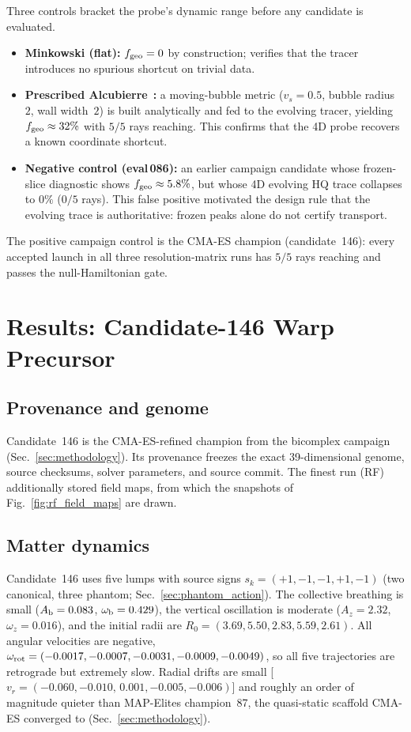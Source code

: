 \documentclass[twocolumn,floatfix,aps,prd,nofootinbib]{revtex4-2}
\begin{document}
Three controls bracket the probe's dynamic range before any candidate is
evaluated.
\begin{itemize}
  \item \textbf{Minkowski (flat):} $f_{\rm geo}=0$ by construction; verifies
    that the tracer introduces no spurious shortcut on trivial data.
  \item \textbf{Prescribed Alcubierre}~\cite{alcubierre94}\textbf{:} a
    moving-bubble metric ($v_s=0.5$, bubble radius~$2$, wall width~$2$) is
    built analytically and fed to the evolving tracer, yielding
    $f_{\rm geo}\approx32\%$ with $5/5$ rays reaching. This confirms
    that the 4D probe recovers a known coordinate shortcut.
  \item \textbf{Negative control (eval\,086):} an earlier campaign candidate
    whose frozen-slice diagnostic shows $f_{\rm geo}\approx5.8\%$, but whose
    4D evolving HQ trace collapses to $0\%$ ($0/5$ rays). This false positive
    motivated the design rule that the evolving trace is authoritative: frozen
    peaks alone do not certify transport.
\end{itemize}
The positive campaign control is the CMA-ES champion (candidate~146): every
accepted launch in all three resolution-matrix runs has $5/5$ rays reaching
and passes the null-Hamiltonian gate.

\section{Results: Candidate-146 Warp Precursor}
\label{sec:results}

\subsection{Provenance and genome}

Candidate~146 is the CMA-ES-refined champion from the bicomplex campaign
(Sec.~\ref{sec:methodology}). Its provenance freezes the exact
39-dimensional genome, source checksums, solver parameters, and source
commit. The finest run (RF) additionally stored field maps, from which the
snapshots of Fig.~\ref{fig:rf_field_maps} are drawn.

\subsection{Matter dynamics}

Candidate~146 uses five lumps with source signs
$s_k=(+1,-1,-1,+1,-1)$ (two canonical, three phantom;
Sec.~\ref{sec:phantom_action}).
The collective breathing is small ($A_{\rm b}=0.083$,
$\omega_{\rm b}=0.429$), the vertical oscillation is moderate ($A_z=2.32$,
$\omega_z=0.016$), and the initial radii are
$R_0=(3.69,5.50,2.83,5.59,2.61)$. All angular velocities are negative,
$\omega_{\rm rot}=(-0.0017,-0.0007,-0.0031,-0.0009,-0.0049)$, so all five
trajectories are retrograde but extremely slow. Radial drifts are small
[$v_r=(-0.060,-0.010,\,0.001,-0.005,-0.006)$] and roughly an order of
magnitude quieter than MAP-Elites champion~87, the quasi-static scaffold
CMA-ES converged to (Sec.~\ref{sec:methodology}).
\end{document}
